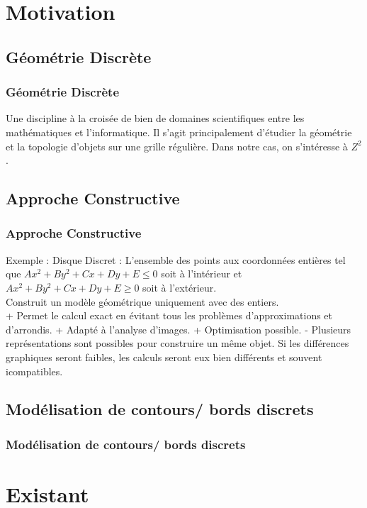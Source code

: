 \documentclass{beamer}
\begin{document}
\section{Motivation} 

\subsection{Géométrie Discrète} 
\begin{frame}
\frametitle{Géométrie Discrète}
Une discipline à la croisée de bien de domaines scientifiques entre les mathématiques et l'informatique. Il s'agit principalement d'étudier la géométrie et la topologie d'objets sur une grille régulière. Dans notre cas, on s'intéresse à $Z^2$.
\end{frame}

\subsection{Approche Constructive}
\begin{frame}
\frametitle{Approche Constructive}
Exemple : Disque Discret : L'ensemble des points aux coordonnées entières tel que $Ax^2+By^2 + Cx + Dy + E \leq 0$ soit à l'intérieur et $Ax^2+By^2 + Cx + Dy + E \geq 0$ soit à l'extérieur.\\
Construit un modèle géométrique uniquement avec des entiers.\\
+ Permet le calcul exact en évitant tous les problèmes d'approximations et d'arrondis.
+ Adapté à l'analyse d'images.
+ Optimisation possible.
- Plusieurs représentations sont possibles pour construire un même objet. Si les différences graphiques seront faibles, les calculs seront eux bien différents et souvent icompatibles.
\end{frame}

\subsection{Modélisation de contours/ bords discrets} 
\begin{frame}
\frametitle{Modélisation de contours/ bords discrets}
\end{frame}

\section{Existant} 
\end{document}
